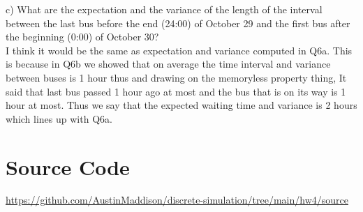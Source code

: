 \documentclass[twocolumn]{article}
\begin{document}
\noindent
\mm c) What are the expectation and the variance of the length of the interval between
the last bus before the end (24:00) of October 29 and the first bus after the
beginning (0:00) of October 30? \normalfont\\

I think it would be the same as expectation and variance computed in Q6a. This is because in Q6b we showed that on average the time interval and variance between buses is 1 hour thus and drawing on the memoryless property thing, It said that last bus passed 1 hour ago at most and the bus that is on its way is 1 hour at most. Thus we say that the expected waiting time and variance is 2 hours which lines up with Q6a. 


	


\section*{Source Code}
\href{https://github.com/AustinMaddison/discrete-simulation/tree/main/HW4/source}{https://github.com/AustinMaddison/discrete-simulation/tree/main/hw4/source}

%
%
\end{document}
